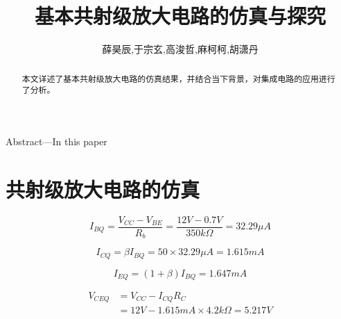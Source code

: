 \documentclass[10pt, conference, compsocconf]{IEEEtran}
\begin{document}

\title{基本共射级放大电路的仿真与探究}


\author{
  薛昊辰,于宗玄,高浚哲,麻柯柯,胡潇丹
}

\maketitle

\begin{abstract}
本文详述了基本共射级放大电路的仿真结果，并结合当下背景，对集成电路的应用进行了分析。
\end{abstract}

\begin{textbf}
Abstract---In this paper
\end{textbf}

\IEEEpeerreviewmaketitle

\section{共射级放大电路的仿真}
\begin{equation}
  I_{BQ}=\frac{V_{CC}-V_{BE}}{R_b}=\frac{12V-0.7V}{350k\Omega}=32.29\mu A
\end{equation}

\begin{equation}
  I_{CQ}=\beta I_{BQ}=50\times32.29\mu A=1.615mA
\end{equation}

\begin{equation}
  I_{EQ}=(1+\beta)I_{BQ}=1.647mA
\end{equation}

\begin{equation}
  \begin{split}
    V_{CEQ}&=V_{CC}-I_{CQ}R_C\\
    &=12V-1.615mA\times 4.2k\Omega=5.217V
  \end{split}
\end{equation}
\end{document}
